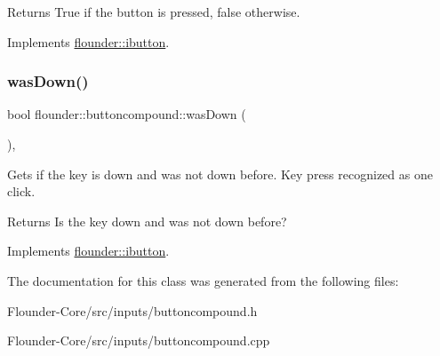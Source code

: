 \begin{DoxyReturn}{Returns}
True if the button is pressed, false otherwise. 
\end{DoxyReturn}


Implements \hyperlink{classflounder_1_1ibutton_af99b936d7329f74a27768ce6eb181327}{flounder\+::ibutton}.

\mbox{\label{classflounder_1_1buttoncompound_ae14c6ee933dbc2550f16bc6307f20989}} 
\subsubsection{\texorpdfstring{was\+Down()}{wasDown()}}
{\footnotesize\ttfamily bool flounder\+::buttoncompound\+::was\+Down (\begin{DoxyParamCaption}{ }\end{DoxyParamCaption})\hspace{0.3cm}{\ttfamily [override]}, {\ttfamily [virtual]}}



Gets if the key is down and was not down before. Key press recognized as one click. 

\begin{DoxyReturn}{Returns}
Is the key down and was not down before? 
\end{DoxyReturn}


Implements \hyperlink{classflounder_1_1ibutton_a5fb7b3493c0ea0e67bb9defc272da0d3}{flounder\+::ibutton}.



The documentation for this class was generated from the following files\+:\begin{DoxyCompactItemize}
\item 
Flounder-\/\+Core/src/inputs/buttoncompound.\+h\item 
Flounder-\/\+Core/src/inputs/buttoncompound.\+cpp\end{DoxyCompactItemize}
